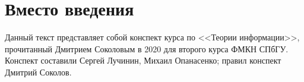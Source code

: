 \section*{Вместо введения}

Данный текст представляет собой конспект курса по <<Теории информации>>, прочитанный Дмитрием Соколовым в
2020 для второго курса ФМКН СПбГУ. Конспект составили Сергей Лучинин, Михаил Опанасенко; правил конспект
Дмитрий Соколов.

